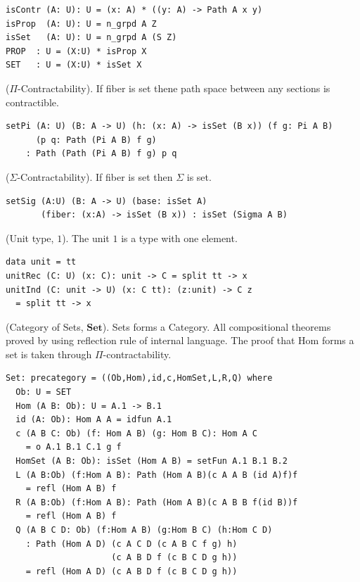 \begin{definition}
\begin{definition}
\begin{lstlisting}
isContr (A: U): U = (x: A) * ((y: A) -> Path A x y)
isProp  (A: U): U = n_grpd A Z
isSet   (A: U): U = n_grpd A (S Z)
PROP  : U = (X:U) * isProp X
SET   : U = (X:U) * isSet X
\end{lstlisting}
\end{definition}

\begin{definition} ($\Pi$-Contractability).
If fiber is set thene path space between any sections is contractible.
\begin{lstlisting}
setPi (A: U) (B: A -> U) (h: (x: A) -> isSet (B x)) (f g: Pi A B)
      (p q: Path (Pi A B) f g)
    : Path (Path (Pi A B) f g) p q
\end{lstlisting}
\end{definition}

\begin{definition} ($\Sigma$-Contractability).
If fiber is set then $\Sigma$ is set.
\begin{lstlisting}
setSig (A:U) (B: A -> U) (base: isSet A)
       (fiber: (x:A) -> isSet (B x)) : isSet (Sigma A B)
\end{lstlisting}
\end{definition}

\begin{definition} (Unit type, $1$).
The unit $1$ is a type with one element.
\begin{lstlisting}
data unit = tt
unitRec (C: U) (x: C): unit -> C = split tt -> x
unitInd (C: unit -> U) (x: C tt): (z:unit) -> C z
  = split tt -> x
\end{lstlisting}
\end{definition}

\begin{theorem} (Category of Sets, $\mathbf{Set}$).
Sets forms a Category.
All compositional theorems proved by using reflection rule of internal language.
The proof that $\mathrm{Hom}$ forms a set is taken through $\Pi$-contractability.
\begin{lstlisting}
Set: precategory = ((Ob,Hom),id,c,HomSet,L,R,Q) where
  Ob: U = SET
  Hom (A B: Ob): U = A.1 -> B.1
  id (A: Ob): Hom A A = idfun A.1
  c (A B C: Ob) (f: Hom A B) (g: Hom B C): Hom A C
    = o A.1 B.1 C.1 g f
  HomSet (A B: Ob): isSet (Hom A B) = setFun A.1 B.1 B.2
  L (A B:Ob) (f:Hom A B): Path (Hom A B)(c A A B (id A)f)f
    = refl (Hom A B) f
  R (A B:Ob) (f:Hom A B): Path (Hom A B)(c A B B f(id B))f
    = refl (Hom A B) f
  Q (A B C D: Ob) (f:Hom A B) (g:Hom B C) (h:Hom C D)
    : Path (Hom A D) (c A C D (c A B C f g) h)
                     (c A B D f (c B C D g h))
    = refl (Hom A D) (c A B D f (c B C D g h))
\end{lstlisting}
\end{theorem}


\end{definition}
